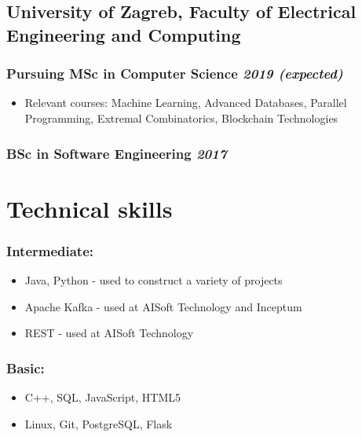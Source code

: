 \documentclass[a4paper]{article}
\newcommand{\bolditalicpair}
[2]
{\textbf{#1} \texorpdfstring{\hfill}{} \textit{#2}}
\begin{document}
\subsection{\bolditalicpair{University of Zagreb, Faculty of Electrical Engineering and Computing}{}}

\subsubsection{\bolditalicpair{Pursuing MSc in Computer Science}{2019 (expected)}}

\begin{itemize}
  \item Relevant courses: Machine Learning, Advanced Databases, Parallel Programming, Extremal Combinatorics, Blockchain Technologies
\end{itemize}

\subsubsection{\bolditalicpair{BSc in Software Engineering}{2017}}



\section{Technical skills}
\subsubsection{\bolditalicpair{Intermediate:}{}}

\begin{itemize}
  \item Java, Python - used to construct a variety of projects
  \item Apache Kafka - used at AISoft Technology and Inceptum
  \item REST - used at AISoft Technology
\end{itemize}

\subsubsection{\bolditalicpair{Basic:}{}}

\begin{itemize}
  \item C++, SQL, JavaScript, HTML5
  \item Linux, Git, PostgreSQL, Flask
\end{itemize}
\end{document}
